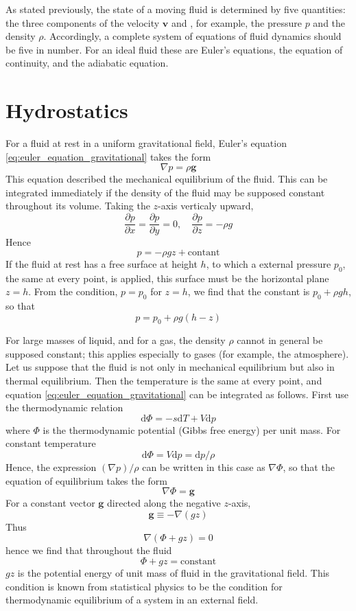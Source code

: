\documentclass[conference]{IEEEtran}
\theoremstyle{definition}
\theoremstyle{remark}
\begin{document}
    As stated previously, the state of a moving fluid is determined by five quantities: the three components of the velocity $\mathbf{v}$ and , for example, the pressure $p$ and the density $\rho$. Accordingly, a complete system of equations of fluid dynamics should be five in number. For an ideal fluid these are Euler's equations, the equation of continuity, and the adiabatic equation.

    \section{Hydrostatics}
    For a fluid at rest in a uniform gravitational field, Euler's equation \ref{eq:euler_equation_gravitational} takes the form
    \begin{equation}
        \nabla p = \rho \mathbf{g}
        \label{eq:gravitational_field}
    \end{equation}
    This equation described the mechanical equilibrium of the fluid. This can be integrated immediately if the density of the fluid may be supposed constant throughout its volume. Taking the $z$-axis verticaly upward,
    \[
        \dfrac{\partial p}{\partial x} = \dfrac{\partial p}{\partial y} = 0, \quad \dfrac{\partial p}{\partial z} = -\rho g
    \]
    Hence
    \[
        p = - \rho g z + \text{contant}
    \]
    If the fluid at rest has a free surface at height $h$, to which a external pressure $p_0$, the same at every point, is applied, this surface must be the horizontal plane $z = h$. From the condition, $p = p_0$ for $z = h$, we find that the constant is $p_0 + \rho g h$, so that
    \begin{equation}
        p = p_0 + \rho g (h - z)
    \end{equation}

    For large masses of liquid, and for a gas, the density $\rho$ cannot in general be supposed constant; this applies especially to gases (for example, the atmosphere). Let us suppose that the fluid is not only in mechanical equilibrium but also in thermal equilibrium. Then the temperature is the same at every point, and equation \ref{eq:euler_equation_gravitational} can be integrated as follows. First use the thermodynamic relation
    \[
        \mathrm{d} \Phi = -s \mathrm{d} T + V \mathrm{d} p
    \]
    where $\Phi$ is the thermodynamic potential (Gibbs free energy) per unit mass. For constant temperature
    \[
        \mathrm{d} \Phi = V \mathrm{d} p = \mathrm{d} p / \rho
    \]
    Hence, the expression $(\nabla p) / \rho$ can be written in this case as $\nabla \Phi$, so that the equation of equilibrium takes the form
    \[
        \nabla \Phi = \mathbf{g}
    \]
    For a constant vector $\mathbf{g}$ directed along the negative $z$-axis,
    \[
        \mathbf{g} \equiv -\nabla (gz)
    \]
    Thus
    \[
        \nabla (\Phi + gz) = 0
    \]
    hence we find that throughout the fluid
    \[
        \Phi + gz = \text{constant}
    \]
    $gz$ is the potential energy of unit mass of fluid in the gravitational field. This condition is known from statistical physics to be the condition for thermodynamic equilibrium of a system in an external field.
\end{document}

